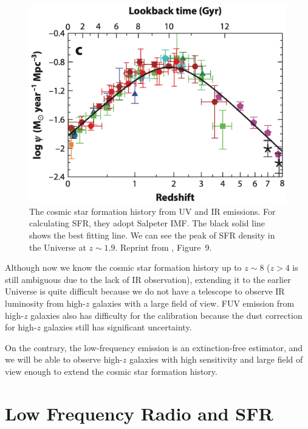 \begin{figure}[htbp]
	\centering
	\includegraphics[width=.7\linewidth]{Chapter_1/Figures/Madau2014_Figure9.png}
    \caption[Cosmic star formation history]{\label{fig:Madau2014_figure9}
        The cosmic star formation history from UV and IR emissions.
        For calculating SFR, they adopt Salpeter IMF\@.
        The black solid line shows the best fitting line.
        We can see the peak of SFR density in the Universe at $z\sim1.9$.
        Reprint from \citealt{Madau2014}, Figure~9.
    }
\end{figure}

Although now we know the cosmic star formation history up to $z\sim8$ ($z > 4$ is still ambiguous due to the lack of IR observation), extending it to the earlier Universe is quite difficult because we do not have a telescope to observe IR luminosity from high-$z$ galaxies with a large field of view.
FUV emission from high-$z$ galaxies also has difficulty for the calibration because the dust correction for high-$z$ galaxies still has significant uncertainty.

On the contrary, the low-frequency emission is an extinction-free estimator, and we will be able to observe high-$z$ galaxies with high sensitivity and large field of view enough to extend the cosmic star formation history.





\section{Low Frequency Radio and SFR}\label{sec:lowradiofrequenciesandsfr}

